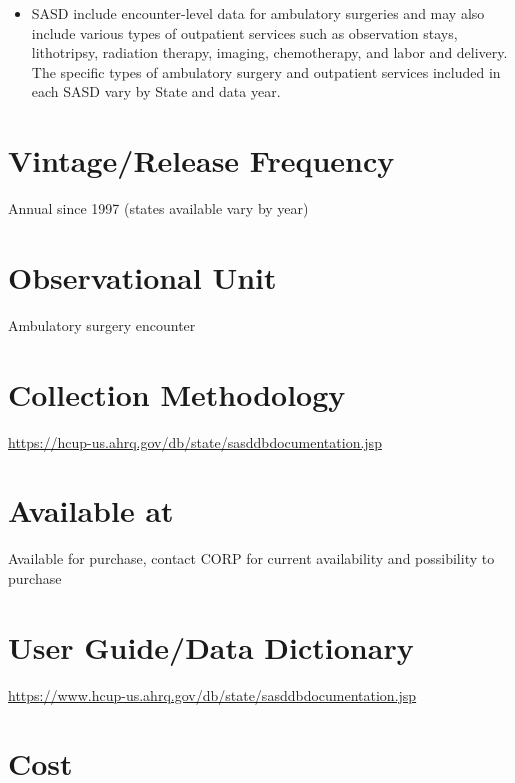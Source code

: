 \documentclass[
]{book}
\providecommand{\tightlist}{%
  \setlength{\itemsep}{0pt}\setlength{\parskip}{0pt}}
\begin{document}
\begin{itemize}
\tightlist
\item
  SASD include encounter-level data for ambulatory surgeries and may also include various types of outpatient services such as observation stays, lithotripsy, radiation therapy, imaging, chemotherapy, and labor and delivery. The specific types of ambulatory surgery and outpatient services included in each SASD vary by State and data year.
\end{itemize}

\hypertarget{vintagerelease-frequency-83}{%
\section{Vintage/Release Frequency}\label{vintagerelease-frequency-83}}

Annual since 1997 (states available vary by year)

\hypertarget{observational-unit-83}{%
\section{Observational Unit}\label{observational-unit-83}}

Ambulatory surgery encounter

\hypertarget{collection-methodology-83}{%
\section{Collection Methodology}\label{collection-methodology-83}}

\url{https://hcup-us.ahrq.gov/db/state/sasddbdocumentation.jsp}

\hypertarget{available-at-83}{%
\section{Available at}\label{available-at-83}}

Available for purchase, contact CORP for current availability and possibility to purchase

\hypertarget{user-guidedata-dictionary-83}{%
\section{User Guide/Data Dictionary}\label{user-guidedata-dictionary-83}}

\url{https://www.hcup-us.ahrq.gov/db/state/sasddbdocumentation.jsp}

\hypertarget{cost-83}{%
\section{Cost}\label{cost-83}}
\end{document}
